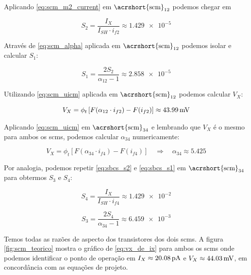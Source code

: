 \documentclass[10pt,a4paper]{extreport}
\newcommand{\?}{\stackrel{?}{=}}
\newcommand{\sis}[2]{\complexnum{#1}\,\si[per-mode=symbol]{#2}}
\begin{document}
Aplicando \eqref{eq:scm_m2_current} em $\text{\acrshort{scm}}_{12}$ podemos chegar em

\begin{equation}
    \label{eq:sbcs_s2}
    S_2=\frac{I_X}{I_{SH}\cdot i_{f2}}\approx\num{1.429e-5}
\end{equation}

Através de \eqref{eq:scm_alpha} aplicada em $\text{\acrshort{scm}}_{12}$ podemos isolar e calcular $S_1$:

\begin{equation}
    \label{eq:sbcs_s1}
    S_1=\frac{2S_2}{\alpha_{12}-1}\approx\num{2.858e-5}
\end{equation}

Utilizando \eqref{eq:scm_uicm} aplicada em $\text{\acrshort{scm}}_{12}$ podemos calcular $V_X$:

\begin{equation}
    \label{eq:sbcs_vx}
    V_X=\phi_t\left[F(\alpha_{12}\cdot i_{f2})-F(i_{f2})\right]\approx\sis{43.99}{\milli\volt}
\end{equation}

Aplicando \eqref{eq:scm_uicm} em $\text{\acrshort{scm}}_{34}$ e lembrando que $V_X$ é o mesmo para ambos os \acrshort{scm}s, podemos calcular $\alpha_{34}$ numericamente:

\begin{equation}
    \label{eq:sbcs_a24}
    V_X=\phi_t\left[F(\alpha_{34}\cdot i_{f4})-F(i_{f4})\right]
    \quad\Rightarrow\quad
    \alpha_{34}\approx\num{5.425}
\end{equation}

Por analogia, podemos repetir \eqref{eq:sbcs_s2} e \eqref{eq:sbcs_s1} em $\text{\acrshort{scm}}_{34}$ para obtermos $S_3$ e $S_4$:

\begin{equation}
    \label{eq:sbcs_s4}
    S_4=\frac{I_X}{I_{SH}\cdot i_{f4}}\approx\num{1.429e-2}
\end{equation}

\begin{equation}
    \label{eq:sbcs_s3}
    S_3=\frac{2S_4}{\alpha_{34}-1}\approx\num{6.459e-3}
\end{equation}

Temos todas as razões de aspecto dos transistores dos dois \acrshort{scm}s. A figura \ref{fig:scm_teorico} mostra o gráfico de \eqref{eq:vx_de_ix} para ambos os \acrshort{scm}s onde podemos identificar o ponto de operação em $I_X\approx\sis{20.08}{\pico\ampere}$ e $V_X\approx\sis{44.03}{\milli\volt}$, em concordância com as equações de projeto.
\end{document}

